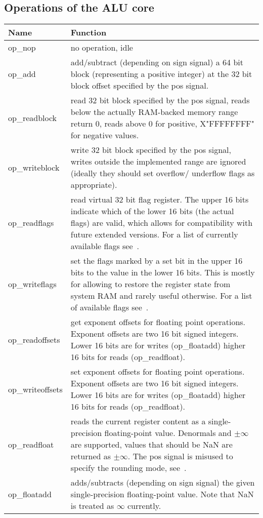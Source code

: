 \subsection{Operations of the ALU core}
\label{sec:aluops}
\renewcommand\tabline[2]{#1 & #2\\ \hline}
\begin{center}
\begin{tabularx}{\textwidth}{|l|X|}
\hline
\tabline {Name}  {Function}
\hline
\tabline {op\_nop} {no operation, idle}
\tabline {op\_add} {
    add/subtract (depending on sign signal) a 64 bit block
    (representing a positive integer) at the 32 bit block offset
    specified by the pos signal.}
\tabline {op\_readblock} {
    read 32 bit block specified by the pos signal, reads
    below the actually RAM-backed memory range return 0,
    reads above 0 for positive, X"FFFFFFFF" for negative values.}
\tabline {op\_writeblock} {
    write 32 bit block specified by the pos signal, writes outside
    the implemented range are ignored (ideally they should set overflow/
    underflow flags as appropriate).}
\tabline {op\_readflags} {
    read virtual 32 bit flag register. The upper 16 bits indicate
    which of the lower 16 bits (the actual flags) are valid, which
    allows for compatibility with future extended versions.
    For a list of currently available flags see~\fref{tab:flags}.}
\tabline {op\_writeflags} {
    set the flags marked by a set bit in the upper 16 bits to
    the value in the lower 16 bits.
    This is mostly for allowing to restore the register state from system
    RAM and rarely useful otherwise.
    For a list of available flags see~\fref{tab:flags}.}
\tabline {op\_readoffsets} {
    get exponent offsets for floating point operations.
    Exponent offsets are two 16 bit signed integers.
    Lower 16 bits are for writes (op\_floatadd) higher 16 bits for reads (op\_readfloat).}
\tabline {op\_writeoffsets} {
    set exponent offsets for floating point operations.
    Exponent offsets are two 16 bit signed integers.
    Lower 16 bits are for writes (op\_floatadd) higher 16 bits for reads (op\_readfloat).}
\tabline {op\_readfloat} {
    reads the current register content as a single-precision
    floating-point value. Denormals and $\pm\infty$ are supported, values that should
    be NaN are returned as $\pm\infty$.
    The pos signal is misused to specify the rounding mode, see~\fref{tab:round}.}
\tabline {op\_floatadd} {
    adds/subtracts (depending on sign signal) the given
    single-precision floating-point value. Note that NaN is treated as $\infty$
    currently.}
\end{tabularx}
\end{center}


